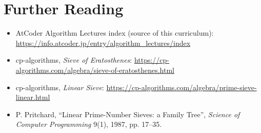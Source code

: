 \documentclass[11pt]{article}
\begin{document}
\section{Further Reading}
\begin{itemize}[leftmargin=1.5em]
  \item AtCoder Algorithm Lectures index (source of this curriculum):
        \url{https://info.atcoder.jp/entry/algorithm_lectures/index}
  \item cp-algorithms, \emph{Sieve of Eratosthenes}:
        \url{https://cp-algorithms.com/algebra/sieve-of-eratosthenes.html}
  \item cp-algorithms, \emph{Linear Sieve}:
        \url{https://cp-algorithms.com/algebra/prime-sieve-linear.html}
  \item P. Pritchard, ``Linear Prime-Number Sieves: a Family Tree'',
        \emph{Science of Computer Programming} 9(1), 1987, pp. 17--35.
\end{itemize}
\end{document}

